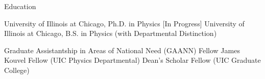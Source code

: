 \begin{rubric}{Education}


  \entry*[2005 --- \ldots] University of Illinois at Chicago, Ph.D. in Physics [In Progress]
  \entry*[2002 --- 2005] University of Illinois at Chicago, B.S. in Physics (with Departmental Distinction)
  

  \entry*[8/2007 --- 7/2010] Graduate Assistantship in Areas of National Need (GAANN) Fellow
  \entry*[2011] James Kouvel Fellow (UIC Physics Departmental)
  \entry*[2011] Dean's Scholar Fellow (UIC Graduate College)

\end{rubric}
